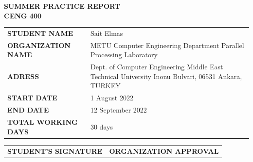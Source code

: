 \documentclass[11pt,a4paper]{article}
\theoremstyle{definition}
\begin{document}
\begin{titlepage}
		\begin{center}
			\huge
			\textbf{SUMMER PRACTICE REPORT \\ CENG 400 \\}
			\vspace{2cm}
		\end{center}
	
		\large
		\begingroup
		\renewcommand{\arraystretch}{2.0} %
		\begin{tabular}{ p{5.6cm} p{10cm} }
			\textbf{STUDENT NAME} & Sait Elmas \\
			\textbf{ORGANIZATION NAME} & METU Computer Engineering Department Parallel Processing Laboratory \\
			\textbf{ADRESS} & Dept. of Computer Engineering Middle East Technical University Inonu Bulvari, 06531 Ankara, TURKEY \\
			\textbf{START DATE} & 1 August 2022 \\
			\textbf{END DATE} & 12 September 2022\\
			\textbf{TOTAL WORKING DAYS} & 30 days \\
		\end{tabular}
		\vspace{2cm}
		\endgroup

		\begin{tabular}{p{9cm} p{9cm}}
			\textbf{STUDENT'S SIGNATURE} & \textbf{ORGANIZATION APPROVAL} \\
		\end{tabular}
		
	\end{titlepage}
	
	\tableofcontents
	\newpage
	
\end{document}
